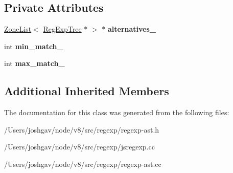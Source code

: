 \subsection*{Private Attributes}
\begin{DoxyCompactItemize}
\item 
\hyperlink{classv8_1_1internal_1_1_zone_list}{Zone\+List}$<$ \hyperlink{classv8_1_1internal_1_1_reg_exp_tree}{Reg\+Exp\+Tree} $\ast$ $>$ $\ast$ {\bfseries alternatives\+\_\+}\hypertarget{classv8_1_1internal_1_1_reg_exp_disjunction_a6926a9401efaeb65d30743e161bdb243}{}\label{classv8_1_1internal_1_1_reg_exp_disjunction_a6926a9401efaeb65d30743e161bdb243}

\item 
int {\bfseries min\+\_\+match\+\_\+}\hypertarget{classv8_1_1internal_1_1_reg_exp_disjunction_aace883e9c504e67672816542fb44bd86}{}\label{classv8_1_1internal_1_1_reg_exp_disjunction_aace883e9c504e67672816542fb44bd86}

\item 
int {\bfseries max\+\_\+match\+\_\+}\hypertarget{classv8_1_1internal_1_1_reg_exp_disjunction_a6ca1f905b5cabea36bb3c3e3880f067f}{}\label{classv8_1_1internal_1_1_reg_exp_disjunction_a6ca1f905b5cabea36bb3c3e3880f067f}

\end{DoxyCompactItemize}
\subsection*{Additional Inherited Members}


The documentation for this class was generated from the following files\+:\begin{DoxyCompactItemize}
\item 
/\+Users/joshgav/node/v8/src/regexp/regexp-\/ast.\+h\item 
/\+Users/joshgav/node/v8/src/regexp/jsregexp.\+cc\item 
/\+Users/joshgav/node/v8/src/regexp/regexp-\/ast.\+cc\end{DoxyCompactItemize}

